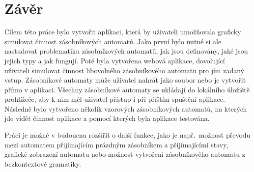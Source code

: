 \chapter{Závěr}\label{chap:Conclusion}

Cílem této práce bylo vytvořit aplikaci, která by uživateli umožňovala graficky simulovat činnost zásobníkových automatů. Jako první bylo nutné si ale nastudovat problematiku zásobníkových automatů, jak jsou definovány, jaké jsou jejich typy a jak fungují. Poté byla vytvořena webová aplikace, dovolující uživateli simulovat činnost libovolného zásobníkového automatu pro jím zadaný vstup. Zásobníkové automaty může uživatel nahrát jako soubor nebo je vytvořit přímo v aplikaci. Všechny zásobníkové automaty se ukládají do lokálního úložiště prohlížeče, aby k nim měl uživatel přístup i při příštím spuštění aplikace. Následně bylo vytvořeno několik vzorových zásobníkových automatů, na kterých jde vidět činnost aplikace a pomocí kterých byla aplikace testována.

Práci je možné v budoucnu rozšířit o další funkce, jako je např.\ možnost převodu mezi automatem přijímajícím prázdným zásobníkem a přijímajícími stavy, grafické zobrazení automatu nebo možnost vytvoření zásobníkového automatu z bezkontextové gramatiky.
\endinput